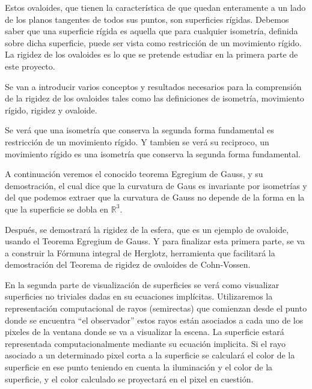 



Estos ovaloides, que tienen la característica de que quedan enteramente a un lado de los planos tangentes de todos sus puntos, son superficies rígidas. Debemos saber que una superficie rígida es aquella que para cualquier isometría, definida sobre dicha superficie, puede ser vista como restricción de un movimiento rígido. La rigidez de los ovaloides es lo que se pretende estudiar en la primera parte de este proyecto.

Se van a introducir varios conceptos y resultados necesarios para la comprensión de la rigidez de los ovaloides tales como las definiciones de isometría, movimiento rígido, rigidez y ovaloide.

Se verá que una isometría que conserva la segunda forma fundamental es restricción de un movimiento rígido. Y tambien se verá su reciproco, un movimiento rígido es una isometría que conserva la segunda forma fundamental.

A continuación veremos el conocido teorema Egregium de Gauss, y su demostración, el cual dice que la curvatura de Gaus es invariante por isometrías y del que podemos extraer que la curvatura de Gauss no depende de la forma en la que la superficie se dobla en $\mathbb{R}^3$.

Después, se demostrará la rigidez de la esfera, que es un ejemplo de ovaloide, usando el Teorema Egregium de Gauss. Y para finalizar esta primera parte, se va a construir la Fórmuna integral de Herglotz, herramienta que facilitará la demostración del Teorema de rigidez de ovaloides de Cohn-Vossen.

En la segunda parte de visualización de superficies se verá como visualizar superficies no triviales dadas en su ecuaciones implícitas. Utilizaremos la representación computacional de rayos (semirectas) que comienzan desde el punto donde se encuentra “el observador” estos rayos están asociados a cada uno de los pixeles de la ventana donde se va a visualizar la escena. La superficie estará representada computacionalmente mediante su ecuación implicita. Si el rayo asociado a un determinado pixel corta a la superficie se calculará el color de la superficie en ese punto teniendo en cuenta la iluminación y el color de la superficie, y el color calculado se proyectará en el pixel en cuestión.

